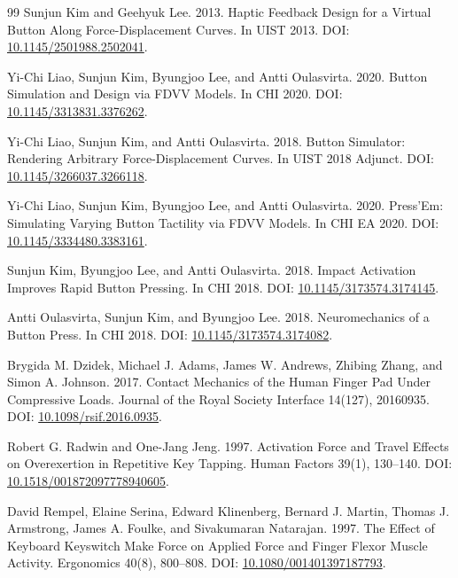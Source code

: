 \documentclass[11pt]{article}
\begin{document}
\begin{thebibliography}{99}
Sunjun Kim and Geehyuk Lee. 2013. Haptic Feedback Design for a Virtual Button Along Force-Displacement Curves. In UIST 2013. DOI: \href{https://doi.org/10.1145/2501988.2502041}{10.1145/2501988.2502041}.

Yi-Chi Liao, Sunjun Kim, Byungjoo Lee, and Antti Oulasvirta. 2020. Button Simulation and Design via FDVV Models. In CHI 2020. DOI: \href{https://doi.org/10.1145/3313831.3376262}{10.1145/3313831.3376262}.

Yi-Chi Liao, Sunjun Kim, and Antti Oulasvirta. 2018. Button Simulator: Rendering Arbitrary Force-Displacement Curves. In UIST 2018 Adjunct. DOI: \href{https://doi.org/10.1145/3266037.3266118}{10.1145/3266037.3266118}.

Yi-Chi Liao, Sunjun Kim, Byungjoo Lee, and Antti Oulasvirta. 2020. Press'Em: Simulating Varying Button Tactility via FDVV Models. In CHI EA 2020. DOI: \href{https://doi.org/10.1145/3334480.3383161}{10.1145/3334480.3383161}.

Sunjun Kim, Byungjoo Lee, and Antti Oulasvirta. 2018. Impact Activation Improves Rapid Button Pressing. In CHI 2018. DOI: \href{https://doi.org/10.1145/3173574.3174145}{10.1145/3173574.3174145}.

Antti Oulasvirta, Sunjun Kim, and Byungjoo Lee. 2018. Neuromechanics of a Button Press. In CHI 2018. DOI: \href{https://doi.org/10.1145/3173574.3174082}{10.1145/3173574.3174082}.

Brygida M. Dzidek, Michael J. Adams, James W. Andrews, Zhibing Zhang, and Simon A. Johnson. 2017. Contact Mechanics of the Human Finger Pad Under Compressive Loads. Journal of the Royal Society Interface 14(127), 20160935. DOI: \href{https://doi.org/10.1098/rsif.2016.0935}{10.1098/rsif.2016.0935}.

Robert G. Radwin and One-Jang Jeng. 1997. Activation Force and Travel Effects on Overexertion in Repetitive Key Tapping. Human Factors 39(1), 130--140. DOI: \href{https://doi.org/10.1518/001872097778940605}{10.1518/001872097778940605}.

David Rempel, Elaine Serina, Edward Klinenberg, Bernard J. Martin, Thomas J. Armstrong, James A. Foulke, and Sivakumaran Natarajan. 1997. The Effect of Keyboard Keyswitch Make Force on Applied Force and Finger Flexor Muscle Activity. Ergonomics 40(8), 800--808. DOI: \href{https://doi.org/10.1080/001401397187793}{10.1080/001401397187793}.


\end{thebibliography}
\end{document}
